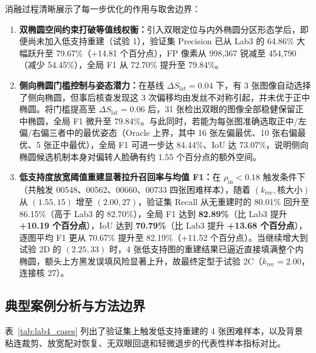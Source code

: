 消融过程清晰展示了每一步优化的作用与取舍边界：
\begin{enumerate}
\item \textbf{双椭圆空间约束打破等值线权衡：}引入双眼定位与内外椭圆分区形态学后，即便尚未加入低支持重建（试验 1），验证集 Precision 已从 Lab3 的 64.86\% 大幅跃升至 79.67\%（+14.81 个百分点），FP 像素从 998,367 锐减至 454,790（减少 54.45\%），全局 F1 从 72.70\% 提升至 79.84\%。
\item \textbf{侧向椭圆门槛控制与姿态潜力：}在基线 $\Delta S_{\text{lat}}=0.04$ 下，有 3 张图像自动选择了侧向椭圆，但事后核查发现这 3 次偏移均由发丝不对称引起，并未优于正中椭圆。将门槛提高至 $\Delta S_{\text{lat}}=0.06$ 后，31 张检出双眼的图像全部稳健保留正中椭圆，全局 F1 微升至 79.84\%。与此同时，若能为每张图准确选取正中/左偏/右偏三者中的最优姿态（Oracle 上界，其中 16 张左偏最优、10 张右偏最优、5 张正中最优），全局 F1 可进一步达 84.44\%、IoU 达 73.07\%，说明侧向椭圆候选机制本身对偏转人脸确有约 1.55 个百分点的额外空间。
\item \textbf{低支持度放宽阈值重建显著拉升召回率与均值 F1：}在 $\rho_{\text{in}}<0.18$ 触发条件下（共触发 00548、00562、00660、00733 四张困难样本），随着 $(k_{\text{rec}}, \text{核大小})$ 从 $(1.55, 15)$ 增至 $(2.00, 27)$，验证集 Recall 从无重建时的 80.01\% 回升至 86.15\%（高于 Lab3 的 82.70\%），全局 F1 达到 \textbf{82.89\%}（比 Lab3 提升 \textbf{+10.19 个百分点}），IoU 达到 \textbf{70.79\%}（比 Lab3 提升 \textbf{+13.68 个百分点}），逐图平均 F1 更从 70.67\% 提升至 82.19\%（+11.52 个百分点）。当继续增大到试验 2D 的 $(2.25, 33)$ 时，4 张低支持图的重建结果已逼近直接填满整个内椭圆，额头上方黑发误填风险显著上升，故最终定型于试验 2C（$k_{\text{rec}}=2.00$，连接核 27）。
\end{enumerate}

\subsection{典型案例分析与方法边界}

表~\ref{tab:lab4_cases} 列出了验证集上触发低支持重建的 4 张困难样本，以及背景粘连裁剪、放宽配对恢复、无双眼回退和轻微退步的代表性样本指标对比。

